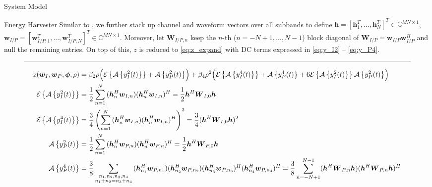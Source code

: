 \documentclass{IEEEtran}
\begin{document}
\begin{section}{System Model}
\begin{subsection}{Energy Harvester}
		Similar to \cite{Huang2017}, we further stack up channel and waveform vectors over all subbands to define $\boldsymbol{h}=[\boldsymbol{h}_1^T,\dots,\boldsymbol{h}_N^T]^T \in \mathbb{C}^{MN \times 1}$, $\boldsymbol{w}_{I/P}=[\boldsymbol{w}_{I/P,1}^T,\dots,\boldsymbol{w}_{I/P,N}^T]^T \in \mathbb{C}^{MN \times 1}$. Moreover, let $\boldsymbol{W}_{I/P,n}$ keep the $n$-th ($n=-N+1,\dots,N-1$) block diagonal of $\boldsymbol{W}_{I/P}=\boldsymbol{w}_{I/P}\boldsymbol{w}_{I/P}^H$ and null the remaining entries. On top of this, $z$ is reduced to \ref{eq:z_expand} with DC terms expressed in \ref{eq:y_I2} -- \ref{eq:y_P4}.
		\begin{figure}[b]
			\hrule
			\begin{align}
				z(\boldsymbol{w}_I,\boldsymbol{w}_P,\boldsymbol{\phi},\rho)
				& = \beta_2\rho\Bigl(\mathcal{E}\left\{\mathcal{A}\left\{y_{I}^2(t)\right\}\right\}+\mathcal{A}\left\{y_{P}^2(t)\right\}\Bigr)+\beta_4\rho^2\Bigl(\mathcal{E}\left\{\mathcal{A}\left\{y_{I}^4(t)\right\}\right\}+\mathcal{A}\left\{y_{P}^4(t)\right\}+6\mathcal{E}\left\{\mathcal{A}\left\{y_{I}^2(t)\right\}\right\}\mathcal{A}\left\{y_{P}^2(t)\right\}\Bigr)\label{eq:z_expand}\\
				\mathcal{E}\left\{\mathcal{A}\left\{y_{I}^2(t)\right\}\right\}
				& = \frac{1}{2}\sum_{n=1}^N{(\boldsymbol{h}_{n}^H\boldsymbol{w}_{I,n})(\boldsymbol{h}_{n}^H\boldsymbol{w}_{I,n})^H} = \frac{1}{2}\boldsymbol{h}^H\boldsymbol{W}_{I,0}\boldsymbol{h}\label{eq:y_I2}\\
				\mathcal{E}\left\{\mathcal{A}\left\{y_{I}^4(t)\right\}\right\}
				& = \frac{3}{4}\left(\sum_{n=1}^N{(\boldsymbol{h}_{n}^H\boldsymbol{w}_{I,n})(\boldsymbol{h}_{n}^H\boldsymbol{w}_{I,n})^H}\right)^2 = \frac{3}{4}(\boldsymbol{h}^H\boldsymbol{W}_{I,0}\boldsymbol{h})^2\\
				\mathcal{A}\left\{y_{P}^2(t)\right\}
				& = \frac{1}{2}\sum_{n=1}^N{(\boldsymbol{h}_{n}^H\boldsymbol{w}_{P,n})(\boldsymbol{h}_{n}^H\boldsymbol{w}_{P,n})^H} = \frac{1}{2}\boldsymbol{h}^H\boldsymbol{W}_{P,0}\boldsymbol{h}\\
				\mathcal{A}\left\{y_{P}^4(t)\right\}
				& = \frac{3}{8}\sum_{\substack{{n_1},{n_2},{n_3},{n_4}\\{n_1}+{n_2}={n_3}+{n_4}}}{(\boldsymbol{h}_{{n_1}}^H\boldsymbol{w}_{P,{n_1}})(\boldsymbol{h}_{{n_2}}^H\boldsymbol{w}_{P,{n_2}})(\boldsymbol{h}_{{n_3}}^H\boldsymbol{w}_{P,{n_3}})^H(\boldsymbol{h}_{{n_4}}^H\boldsymbol{w}_{P,{n_4}})^H} = \frac{3}{8}\sum_{n=-N+1}^{N-1}(\boldsymbol{h}^H\boldsymbol{W}_{P,n}\boldsymbol{h})(\boldsymbol{h}^H\boldsymbol{W}_{P,n}\boldsymbol{h})^H\label{eq:y_P4}

\end{align}
\end{figure}
\end{subsection}
\end{section}
\end{document}
